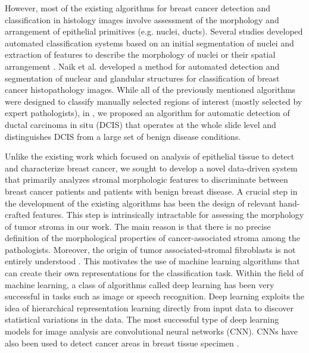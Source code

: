 \documentclass{article}
\begin{document}
However, most of the existing algorithms for breast cancer detection and classification in histology images \cite{dundar2011,Dong2014,Naik2008,Ehteshami16} involve assessment of the morphology and arrangement of epithelial primitives (e.g. nuclei, ducts). Several studies developed automated classification systems based on an initial segmentation of nuclei and extraction of features to describe the morphology of nuclei or their spatial arrangement \cite{dundar2011,Dong2014}. Naik et al. \cite{Naik2008} developed a method for automated detection and segmentation of nuclear and glandular structures for classification of breast cancer histopathology images. \iffalse A large set of features describing the morphology of the glandular regions and spatial arrangement of nuclei was extracted for training a support vector machine classifier, yielding an overall accuracy of 80\% for classifying different breast cancer grades on a very small dataset containing a total of 21 pre-selected small region of interest images. Doyle et al. \cite{doyle2008} further investigated the use of hand-crafted texture features for grading breast cancer histopathology images.\fi  While all of the previously mentioned algorithms were designed to classify manually selected regions of interest (mostly selected by expert pathologists), in \cite{Ehteshami16}, we proposed an algorithm for automatic detection of ductal carcinoma in situ (DCIS) that operates at the whole slide level and distinguishes DCIS from a large set of benign disease conditions. 

Unlike the existing work which focused on analysis of epithelial tissue to detect and characterize breast cancer, we sought to develop a novel data-driven system that primarily analyzes stromal morphologic features to discriminate between breast cancer patients and patients with benign breast disease. A crucial step in the development of the existing algorithms has been the design of relevant hand-crafted features. This step is intrinsically intractable for assessing the morphology of tumor stroma in our work. The main reason is that there is no precise definition of the morphological properties of cancer-associated stroma among the pathologists. Moreover, the origin of tumor associated-stromal fibroblasts is not entirely understood \cite{shiga2015}. This motivates the use of machine learning algorithms that can create their own representations for the classification task. Within the field of machine learning, a class of algorithms called deep learning has been very successful in tasks such as image or speech recognition. Deep learning exploits the idea of hierarchical representation learning directly from input data to discover statistical variations in the data. The most successful type of deep learning models for image analysis are convolutional neural networks (CNN). \iffalse The use of CNN for pathology image analysis has been successful in recent years \cite{wang2016, litjens2016}.\fi CNNs have also been used to detect cancer areas in breast tissue specimen \cite{cruz201}.
\end{document}
